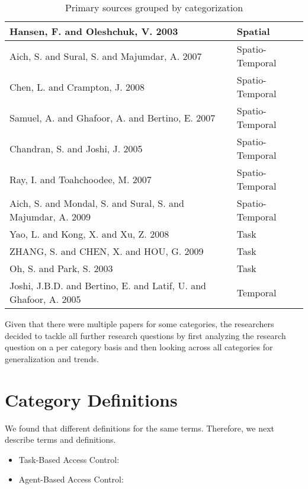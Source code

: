\begin{table}
\begin{tabular}{|p{12.5cm}|p{3cm}|}
Hansen, F. and Oleshchuk, V. 2003 \cite{hansen2003spatial} & Spatial \\\hline
Aich, S. and Sural, S. and Majumdar, A. 2007 \cite{aich07:STARBAC} & Spatio-Temporal \\\hline
Chen, L. and Crampton, J. 2008 \cite{chen08:spatio-temporal} & Spatio-Temporal \\\hline
Samuel, A. and Ghafoor, A. and Bertino, E. 2007 \cite{samuel07:spatio-temporal} & Spatio-Temporal \\\hline
Chandran, S. and Joshi, J. 2005 \cite{chandran05:llt} & Spatio-Temporal \\\hline
Ray, I. and Toahchoodee, M. 2007 \cite{ray07:spatio} & Spatio-Temporal \\\hline
Aich, S. and Mondal, S. and Sural, S. and Majumdar, A. 2009 \cite{aich09:role} & Spatio-Temporal \\\hline
Yao, L. and Kong, X. and Xu, Z. 2008 \cite{yao2008task} & Task \\\hline
ZHANG, S. and CHEN, X. and HOU, G. 2009 \cite{zhou2007team} & Task \\\hline
Oh, S. and Park, S. 2003 \cite{oh2003task} & Task \\\hline
Joshi, J.B.D. and Bertino, E. and Latif, U. and Ghafoor, A. 2005 \cite{joshi05:generalized} & Temporal \\\hline

\end{tabular}
\caption{Primary sources grouped by categorization}
\label{tab:categorization}
\end{table}

Given that there were multiple papers for some categories, the researchers decided to tackle all further research questions by first analyzing the research question on a per category basis and then looking across all categories for generalization and trends.

\section{Category Definitions} \label{sec:terms}

We found that different definitions for the same terms. Therefore, we next describe
terms and definitions.

\begin{itemize}
	\item Task-Based Access Control:
	\item Agent-Based Access Control:						
\end{itemize}



